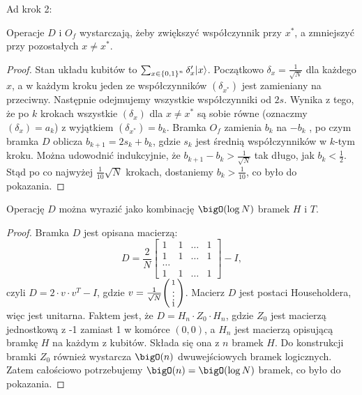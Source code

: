 Ad krok 2:
\begin{lemma}
    Operacje \( D \) i \( O_f \) wystarczają, żeby zwiększyć współczynnik przy \( x^{*} \), a zmniejszyć przy pozostałych \( x \neq x^{*} \).
\end{lemma}
\begin{proof}
    Stan układu kubitów to \( \sum_{x \in \set{0,1}^n} \delta'_x |x\rangle \). Początkowo \( \delta_x = \frac{1}{\sqrt{N}} \) dla każdego \( x \),
    a w każdym kroku jeden ze współczynników \( (\delta_{x^{*}}) \) jest zamieniany na przeciwny. Następnie odejmujemy wszystkie współczynniki od \( 2s \).
    Wynika z tego, że po \( k \) krokach wszystkie \( (\delta_x) \) dla \( x \neq x^{*} \) są sobie równe (oznaczmy \( (\delta_x) = a_k \)) z wyjątkiem \( (\delta_{x^{*}}) = b_k \).
    Bramka \( O_f \) zamienia \( b_k \) na \( -b_k \) , po czym bramka \( D \) oblicza \( b_{k+1} = 2s_k + b_k \), gdzie \( s_k \) jest średnią współczynników w \( k \)-tym kroku.
    Można udowodnić indukcyjnie, że \( b_{k+1} - b_k > \frac{1}{\sqrt{N}} \) tak długo, jak \( b_k < \frac{1}{2} \).
    Stąd po co najwyżej \( \frac{1}{10} \sqrt{N} \) krokach, dostaniemy \( b_k > \frac{1}{10} \), co było do pokazania.
\end{proof}
\begin{lemma}
    Operację \( D \) można wyrazić jako kombinację \( \bigO(\log N) \) bramek \( H \) i \( T \).
\end{lemma}
\begin{proof}
    Bramka \( D \) jest opisana macierzą:
    \[
        D = \frac{2}{N}
        \begin{bmatrix}
        1 & 1 & \ldots & 1 \\
        1 & 1 & \ldots & 1 \\
        \ldots \\
        1 & 1 & \ldots & 1
        \end{bmatrix}
        - I,
    \]
    czyli \( D = 2 \cdot v \cdot v^T - I \), gdzie \( v = \frac{1}{\sqrt{N}}
    \pars{\begin{smallmatrix}
    1 \\
    \vdots \\
    1
    \end{smallmatrix}} \).
    Macierz \( D \) jest postaci Householdera, więc jest unitarna. Faktem jest, że \( D = H_n \cdot Z_0 \cdot H_n \), gdzie \( Z_0 \) jest macierzą jednostkową z -1 zamiast 1 w komórce \( (0,0) \),
    a \( H_n \) jest macierzą opisującą bramkę \( H \) na każdym z kubitów. Składa się ona z \( n \) bramek \( H \). Do konstrukcji bramki \( Z_0 \) również wystarcza \( \bigO(n) \) dwuwejściowych bramek logicznych.
    Zatem całościowo potrzebujemy \( \bigO(n) = \bigO(\log N) \) bramek, co było do pokazania.
\end{proof}
